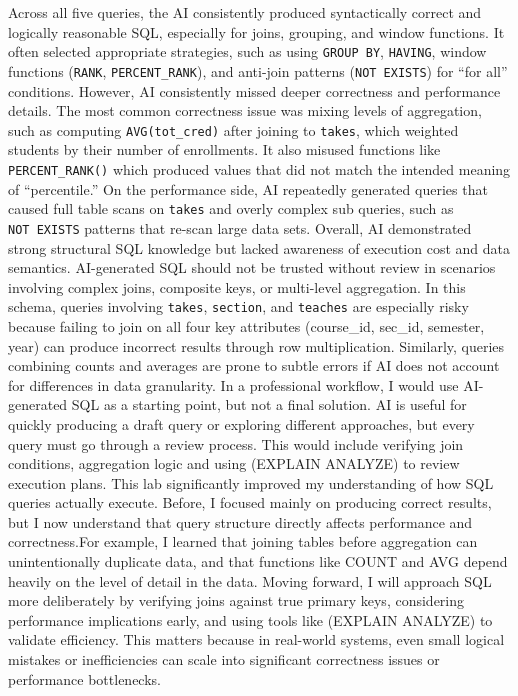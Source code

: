 \documentclass[
  letterpaper,
  DIV=11,
  numbers=noendperiod]{scrartcl}
\begin{document}
Across all five queries, the AI consistently produced syntactically
correct and logically reasonable SQL, especially for joins, grouping,
and window functions. It often selected appropriate strategies, such as
using \texttt{GROUP\ BY}, \texttt{HAVING}, window functions
(\texttt{RANK}, \texttt{PERCENT\_RANK}), and anti-join patterns
(\texttt{NOT\ EXISTS}) for ``for all'' conditions. However, AI
consistently missed deeper correctness and performance details. The most
common correctness issue was mixing levels of aggregation, such as
computing \texttt{AVG(tot\_cred)} after joining to \texttt{takes}, which
weighted students by their number of enrollments. It also misused
functions like \texttt{PERCENT\_RANK()} which produced values that did
not match the intended meaning of ``percentile.'' On the performance
side, AI repeatedly generated queries that caused full table scans on
\texttt{takes} and overly complex sub queries, such as
\texttt{NOT\ EXISTS} patterns that re-scan large data sets. Overall, AI
demonstrated strong structural SQL knowledge but lacked awareness of
execution cost and data semantics. AI-generated SQL should not be
trusted without review in scenarios involving complex joins, composite
keys, or multi-level aggregation. In this schema, queries involving
\texttt{takes}, \texttt{section}, and \texttt{teaches} are especially
risky because failing to join on all four key attributes (course\_id,
sec\_id, semester, year) can produce incorrect results through row
multiplication. Similarly, queries combining counts and averages are
prone to subtle errors if AI does not account for differences in data
granularity. In a professional workflow, I would use AI-generated SQL as
a starting point, but not a final solution. AI is useful for quickly
producing a draft query or exploring different approaches, but every
query must go through a review process. This would include verifying
join conditions, aggregation logic and using (EXPLAIN ANALYZE) to review
execution plans. This lab significantly improved my understanding of how
SQL queries actually execute. Before, I focused mainly on producing
correct results, but I now understand that query structure directly
affects performance and correctness.For example, I learned that joining
tables before aggregation can unintentionally duplicate data, and that
functions like COUNT and AVG depend heavily on the level of detail in
the data. Moving forward, I will approach SQL more deliberately by
verifying joins against true primary keys, considering performance
implications early, and using tools like (EXPLAIN ANALYZE) to validate
efficiency. This matters because in real-world systems, even small
logical mistakes or inefficiencies can scale into significant
correctness issues or performance bottlenecks.
\end{document}
